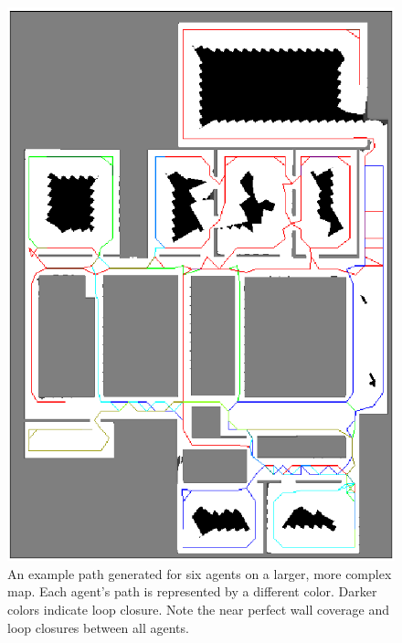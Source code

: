\documentclass[letterpaper, 10 pt, conference]{ieeeconf}  %
\begin{document}
\begin{figure}
\centering
\includegraphics[width=1.0\linewidth]{six_agent_path.png}
\caption[An example path generated for six agents on a large complex map]{An example path generated for six agents on a larger, more complex map. Each agent's path is represented by a different color. Darker colors indicate loop closure. Note the near perfect wall coverage and loop closures between all agents.}
\label{fig:six_path}
\end{figure}
\end{document}
